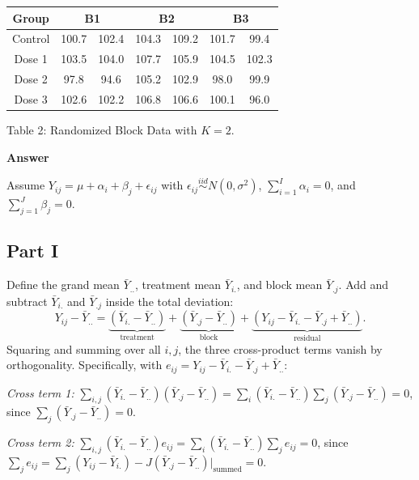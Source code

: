 \documentclass[letterpaper]{article}
\begin{document}
		\begin{center}
			\begin{tabular}{c|cc|cc|cc}
				\hline
				Group & \multicolumn{2}{c}{B1} & \multicolumn{2}{c}{B2} & \multicolumn{2}{c}{B3} \\
				\hline
				Control & 100.7 & 102.4 & 104.3 & 109.2 & 101.7 & 99.4 \\
				Dose 1  & 103.5 & 104.0 & 107.7 & 105.9 & 104.5 & 102.3 \\
				Dose 2  & 97.8  & 94.6  & 105.2 & 102.9 & 98.0  & 99.9 \\
				Dose 3  & 102.6 & 102.2 & 106.8 & 106.6 & 100.1 & 96.0 \\
				\hline
			\end{tabular}
			
			Table 2: Randomized Block Data with $K=2$.
		\end{center}
		
		\textbf{Answer}
		
		Assume $Y_{ij} = \mu + \alpha_i + \beta_j + \epsilon_{ij}$ with
		$\epsilon_{ij} \overset{iid}{\sim} N(0,\sigma^2)$,
		$\sum_{i=1}^I \alpha_i = 0$, and $\sum_{j=1}^J \beta_j = 0$.
		
		\subsection{Part I}
			
			Define the grand mean $\bar{Y}_{..}$, treatment mean $\bar{Y}_{i.}$, and block mean $\bar{Y}_{.j}$.
			Add and subtract $\bar{Y}_{i.}$ and $\bar{Y}_{.j}$ inside the total deviation:
			\[
			Y_{ij} - \bar{Y}_{..}
			= \underbrace{(\bar{Y}_{i.} - \bar{Y}_{..})}_{\text{treatment}}
			+ \underbrace{(\bar{Y}_{.j} - \bar{Y}_{..})}_{\text{block}}
			+ \underbrace{(Y_{ij} - \bar{Y}_{i.} - \bar{Y}_{.j} + \bar{Y}_{..})}_{\text{residual}}.
			\]
			Squaring and summing over all $i,j$, the three cross-product terms vanish by orthogonality.
			Specifically, with $e_{ij} = Y_{ij} - \bar{Y}_{i.} - \bar{Y}_{.j} + \bar{Y}_{..}$:
			
			\textit{Cross term 1:} $\sum_{i,j}(\bar{Y}_{i.}-\bar{Y}_{..})(\bar{Y}_{.j}-\bar{Y}_{..})
			= \sum_i(\bar{Y}_{i.}-\bar{Y}_{..})\sum_j(\bar{Y}_{.j}-\bar{Y}_{..}) = 0$,
			since $\sum_j(\bar{Y}_{.j}-\bar{Y}_{..})=0$.
			
			\textit{Cross term 2:} $\sum_{i,j}(\bar{Y}_{i.}-\bar{Y}_{..})e_{ij}
			= \sum_i(\bar{Y}_{i.}-\bar{Y}_{..})\sum_j e_{ij} = 0$,
			since $\sum_j e_{ij} = \sum_j(Y_{ij}-\bar{Y}_{i.}) - J(\bar{Y}_{.j}-\bar{Y}_{..})\big|_{\text{summed}} = 0$.
			
\end{document}
